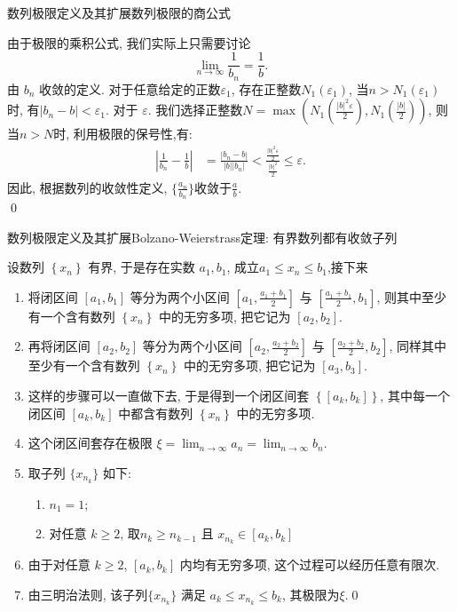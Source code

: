 \documentclass[
10pt,
aspectratio=43,
]{beamer}
\begin{document}
\begin{frame}{数列极限定义及其扩展}{数列极限的商公式}
    \begin{block}{}
        由于极限的乘积公式, 我们实际上只需要讨论
        \[
            \lim_{n\to\infty}\frac{1}{b_n}=\frac{1}{b}.
        \]
        由 $b_n$ 收敛的定义.  对于任意给定的正数$\varepsilon_1$, 存在正整数$N_1(\varepsilon_1)$, 当$n > N_1(\varepsilon_1)$时, 有$|b_n - b| < \varepsilon_1$. 对于 $\varepsilon$. 我们选择正整数$N = \max(N_1(\frac{|b|^2\varepsilon}{2}), N_1(\frac{|b|}{2}))$, 则当$n > N$时, 利用极限的保号性,有:
        \begin{align*}
            \left|\frac{1}{b_n}-\frac{1}{b}\right| & = \frac{|b_n-b|}{|b||b_n|}<\frac{\frac{|b|^2\varepsilon}{2}}{\frac{|b|^2}{2}}\leq\varepsilon.
        \end{align*}
        因此, 根据数列的收敛性定义, $\{\frac{a_n}{b_n}\}$收敛于$\frac{a}{b}$.\\\qed
    \end{block}
\end{frame}

\begin{frame}{数列极限定义及其扩展}{Bolzano-Weierstrass定理: 有界数列都有收敛子列}
    \begin{exampleblock}{}
        设数列 $\left\{x_n\right\}$ 有界, 于是存在实数 $a_1, b_1$, 成立$a_1 \leqslant x_n\leqslant b_1$,接下来
        \begin{enumerate}
            \item 将闭区间 $\left[a_1, b_1\right]$ 等分为两个小区间 $\left[a_1, \frac{a_1+b_1}{2}\right]$ 与 $\left[\frac{a_1+b_1}{2}, b_1\right]$, 则其中至少有一个含有数列 $\left\{x_n\right\}$ 中的无穷多项, 把它记为 $\left[a_2, b_2\right]$.
            \item 再将闭区间 $\left[a_2, b_2\right]$ 等分为两个小区间 $\left[a_2, \frac{a_2+b_2}{2}\right]$ 与 $\left[\frac{a_2+b_2}{2}, b_2\right]$, 同样其中至少有一个含有数列 $\left\{x_n\right\}$ 中的无穷多项, 把它记为 $\left[a_3, b_3\right]$.
            \item  这样的步骤可以一直做下去, 于是得到一个闭区间套 $\left\{\left[a_k, b_k\right]\right\}$, 其中每一个闭区间 $\left[a_k, b_k\right]$ 中都含有数列 $\left\{x_n\right\}$ 中的无穷多项.
            \item 这个闭区间套存在极限 $\displaystyle\xi=\lim_{n\to\infty}a_n=\lim_{n\to\infty}b_n$.
            \item 取子列 $\{x_{n_k}\}$ 如下:
                  \begin{enumerate}
                      \item $n_1=1$;
                      \item 对任意 $k\ge2$, 取$n_k\ge n_{k-1}$ 且 $x_{n_k}\in [a_{k},b_{k}]$
                  \end{enumerate}
            \item 由于对任意 $k\ge2$, $[a_{k},b_{k}]$ 内均有无穷多项, 这个过程可以经历任意有限次.
            \item 由三明治法则, 该子列$\{x_{n_k}\}$ 满足 $a_k\leq x_{n_k}\leq b_k$, 其极限为$\xi$.\qed
        \end{enumerate}
    \end{exampleblock}
\end{frame}
\end{document}
